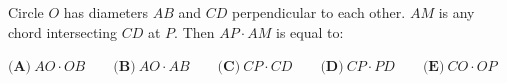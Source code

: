 Circle $O$ has diameters $AB$ and $CD$ perpendicular to each other. $AM$ is any chord intersecting $CD$ at $P$. Then $AP\cdot AM$ is equal to:

$\textbf{(A)}\ AO\cdot OB\qquad\textbf{(B)}\ AO\cdot AB\qquad\textbf{(C)}\ CP\cdot CD\qquad\textbf{(D)}\ CP\cdot PD\qquad\textbf{(E)}\ CO\cdot OP$
